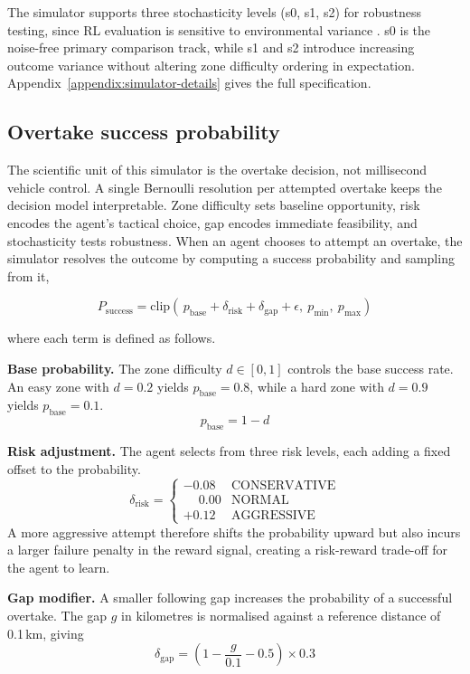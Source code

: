 The simulator supports three stochasticity levels (s0, s1, s2) for robustness testing, since RL evaluation is sensitive to environmental variance \citep{henderson2018deep, agarwal2021statistical, sankary2018stochastic}. s0 is the noise-free primary comparison track, while s1 and s2 introduce increasing outcome variance without altering zone difficulty ordering in expectation. Appendix~\ref{appendix:simulator-details} gives the full specification.

\subsection{Overtake success probability}
\label{sec:overtake-prob}

The scientific unit of this simulator is the overtake decision, not millisecond vehicle control. A single Bernoulli resolution per attempted overtake keeps the decision model interpretable. Zone difficulty sets baseline opportunity, risk encodes the agent's tactical choice, gap encodes immediate feasibility, and stochasticity tests robustness. When an agent chooses to attempt an overtake, the simulator resolves the outcome by computing a success probability and sampling from it,

\[
P_{\text{success}} = \text{clip}\!\left(\, p_{\text{base}} + \delta_{\text{risk}} + \delta_{\text{gap}} + \epsilon,\ p_{\min},\ p_{\max} \right)
\]

where each term is defined as follows.

\textbf{Base probability.} The zone difficulty $d \in [0,1]$ controls the base success rate. An easy zone with $d = 0.2$ yields $p_{\text{base}} = 0.8$, while a hard zone with $d = 0.9$ yields $p_{\text{base}} = 0.1$.
\[
p_{\text{base}} = 1 - d
\]

\textbf{Risk adjustment.} The agent selects from three risk levels, each adding a fixed offset to the probability.
\[
\delta_{\text{risk}} = \begin{cases}
-0.08 & \text{CONSERVATIVE} \\
\phantom{+}0.00 & \text{NORMAL} \\
+0.12 & \text{AGGRESSIVE}
\end{cases}
\]
A more aggressive attempt therefore shifts the probability upward but also incurs a larger failure penalty in the reward signal, creating a risk-reward trade-off for the agent to learn.

\textbf{Gap modifier.} A smaller following gap increases the probability of a successful overtake. The gap $g$ in kilometres is normalised against a reference distance of 0.1\,km, giving
\[
\delta_{\text{gap}} = \left(1 - \frac{g}{0.1} - 0.5\right) \times 0.3
\]


